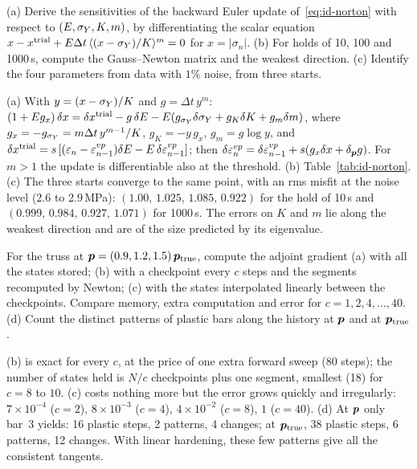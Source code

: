 \label{exo:id-norton}
%
(a) Derive the sensitivities of the backward Euler update of~\eqref{eq:id-norton}
with respect to $(E,\sigma_{Y},K,m)$, by differentiating the scalar equation
$x-x^{\mathrm{trial}}+E\Delta t\,\langle (x-\sigma_{Y})/K\rangle^m=0$ for $x=|\sigma_n|$. (b) For holds of 10,
100 and 1000\,s, compute the Gauss--Newton matrix and the weakest direction.
(c) Identify the four parameters from data with $1\%$ noise, from three starts.
\begin{solution}
(a) With $y=(x-\sigma_{Y})/K$ and $g=\Delta t\,y^m$:
$(1+Eg_x)\,\delta x=\delta x^{\mathrm{trial}}-g\,\delta E-E(g_{\sigma_{Y}}\delta\sigma_{Y}+g_K\delta K+g_m\delta m)$,
where $g_x=-g_{\sigma_{Y}}=m\Delta t\,y^{m-1}/K$, $g_K=-y\,g_x$, $g_m=g\log y$, and
$\delta x^{\mathrm{trial}}=s\,[(\varepsilon_n-\varepsilon^{vp}_{n-1})\delta E-E\,\delta\varepsilon^{vp}_{n-1}]$;
then $\delta\varepsilon^{vp}_n=\delta\varepsilon^{vp}_{n-1}+s(g_x\delta x+\delta_{\bm{p}}g)$.
For $m>1$ the update is differentiable also at the threshold. (b)
Table~\ref{tab:id-norton}. (c) The three starts converge to the same point, with
an rms misfit at the noise level (2.6 to 2.9\,MPa): $(1.00,\,1.025,\,1.085,\,0.922)$
for the hold of 10\,s and $(0.999,\,0.984,\,0.927,\,1.071)$ for 1000\,s. The errors on
$K$ and $m$ lie along the weakest direction and are of the size predicted by its
eigenvalue.

\end{solution}

\label{exo:id-storage}
%
For the truss at $\bm{p}=(0.9,1.2,1.5)\,\bm{p}_{\mathrm{true}}$, compute the adjoint gradient
(a) with all the states stored; (b) with a checkpoint every $c$ steps and the
segments recomputed by Newton; (c) with the states interpolated linearly between
the checkpoints. Compare memory, extra computation and error for
$c=1,2,4,\dots,40$. (d) Count the distinct patterns of plastic bars along the
history at $\bm{p}$ and at $\bm{p}_{\mathrm{true}}$.
\begin{solution}
(b) is exact for every $c$, at the price of one extra forward sweep (80 steps);
the number of states held is $N/c$ checkpoints plus one segment, smallest (18) for
$c=8$ to $10$. (c) costs nothing more but the error grows quickly and
irregularly: $7\times10^{-4}$ ($c=2$), $8\times10^{-3}$ ($c=4$), $4\times10^{-2}$ ($c=8$),
$1$ ($c=40$). (d) At $\bm{p}$ only bar~3 yields: 16 plastic steps, 2 patterns, 4
changes; at $\bm{p}_{\mathrm{true}}$, 38 plastic steps, 6 patterns, 12 changes. With
linear hardening, these few patterns give all the consistent tangents.

\end{solution}

